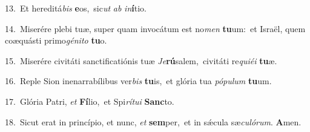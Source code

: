 {\numbfont\textcolor{\numbcolor}{13.}}~Et hereditá\textit{bis} \textbf{e}\-os,~\star sic\textit{ut} \textit{ab} \textit{in}\-\textbf{í}tio.\par
{\numbfont\textcolor{\numbcolor}{14.}}~Miserére plebi tuæ, super quam invocátum est no\textit{men} \textbf{tu}\-um:~\star et Israël, quem coæquásti primo\-\textit{gé}\-\textit{ni}\textit{to} \textbf{tu}\-o.\par
{\numbfont\textcolor{\numbcolor}{15.}}~Miserére civitáti sanctificatiónis tuæ \textit{Je}\-\textbf{rú}salem,~\star civitáti re\-\textit{qui}\-\textit{é}\textit{i} \textbf{tu}\-æ.\par
{\numbfont\textcolor{\numbcolor}{16.}}~Reple Sion inenarrabílibus ver\textit{bis} \textbf{tu}\-is,~\star et glória tua \textit{pó}\-\textit{pu}\textit{lum} \textbf{tu}\-um.\par
{\numbfont\textcolor{\numbcolor}{17.}}~Glória Patri, \textit{et} \textbf{Fí}\-lio,~\star et Spi\-\textit{rí}\-\textit{tu}\textit{i} \textbf{Sanc}\-to.\par
{\numbfont\textcolor{\numbcolor}{18.}}~Sicut erat in princípio, et nunc, \textit{et} \textbf{sem}\-per,~\star et in sǽcula sæ\-\textit{cu}\-\textit{ló}\textit{rum}. \textbf{A}\-men.\par
